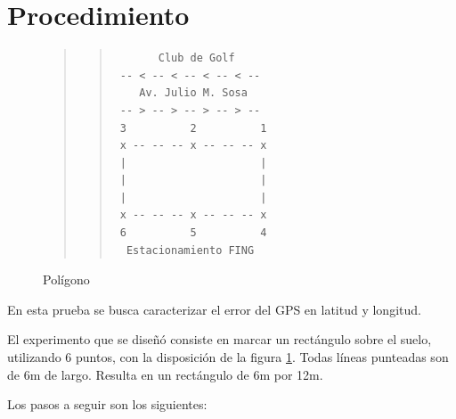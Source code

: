 \documentclass[main]{subfiles}
\begin{document}
\newpage
\section{Procedimiento}
\label{sec:gps2-procedimiento}

\begin{figure}
\vspace{-50pt}
\begin{quote}
\begin{quote}
\begin{verbatim}
       Club de Golf
 -- < -- < -- < -- < --
    Av. Julio M. Sosa
 -- > -- > -- > -- > --
 3          2          1
 x -- -- -- x -- -- -- x
 |                     |
 |                     |
 |                     |
 x -- -- -- x -- -- -- x
 6          5          4
  Estacionamiento FING
\end{verbatim}
\end{quote}
\end{quote}
\vspace{-10pt}
\caption{Polígono}
\vspace{-20pt}
\label{fig:pol-pedorro}
\end{figure}

En esta prueba se busca caracterizar el error del GPS en latitud y longitud.

El experimento que se diseñó consiste en marcar un rectángulo sobre el suelo, utilizando 6 puntos, con la disposición de la figura \ref{fig:pol-pedorro}. Todas líneas punteadas son de 6m de largo. Resulta en un rectángulo de 6m por 12m.

Los pasos a seguir son los siguientes:
\end{document}
